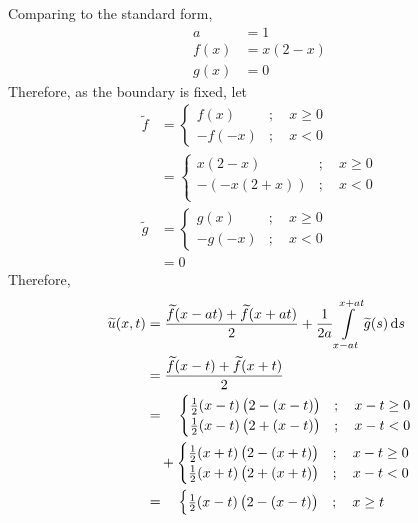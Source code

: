 \documentclass[titlepage, fleqn, a4paper, 12pt, twoside]{article}
\theoremstyle{definition}
\theoremstyle{theorem}
\renewcommand{\tilde}{\widetilde}
\begin{document}
\begin{solution}
	Comparing to the standard form,
	\begin{align*}
		a    & = 1         \\
		f(x) & = x (2 - x) \\
		g(x) & = 0
	\end{align*}
	Therefore, as the boundary is fixed, let
	\begin{align*}
		\tilde{f} &=
			\begin{cases}
				f(x)   & ;\quad x \ge 0 \\
				-f(-x) & ;\quad x < 0
			\end{cases}\\
		&=
			\begin{cases}
				x (2 - x)                   & ;\quad x \ge 0 \\
				- \left( -x (2 + x) \right) & ;\quad x < 0   \\
			\end{cases}\\
		\tilde{g} &=
			\begin{cases}
				g(x)   & ;\quad x \ge 0 \\
				-g(-x) & ;\quad x < 0
			\end{cases}\\
		&= 0
	\end{align*}
	Therefore,
	\begin{align*}
		\tilde{u}(x,t) &= \frac{\tilde{f}(x - a t) + \tilde{f}(x + a t)}{2} + \frac{1}{2 a} \int\limits_{x - a t}^{x + a t} \tilde{g}(s) \dif s\\
		&= \frac{\tilde{f}(x - t) + \tilde{f}(x + t)}{2}\\
		&= \quad
			\begin{cases}
				\frac{1}{2} (x - t) \left( 2 - (x - t) \right) & ;\quad x - t \ge 0 \\
				\frac{1}{2} (x - t) \left( 2 + (x - t) \right) & ;\quad x - t < 0   \\
			\end{cases}\\
		&\quad +
			\begin{cases}
				\frac{1}{2} (x + t) \left( 2 - (x + t) \right) & ;\quad x - t \ge 0 \\
				\frac{1}{2} (x + t) \left( 2 + (x + t) \right) & ;\quad x - t < 0   \\
			\end{cases}\\
		&= \quad
			\begin{cases}
				\frac{1}{2} (x - t) \left( 2 - (x - t) \right) & ;\quad x \ge t \\

\end{cases}
\end{align*}
\end{solution}
\end{document}

